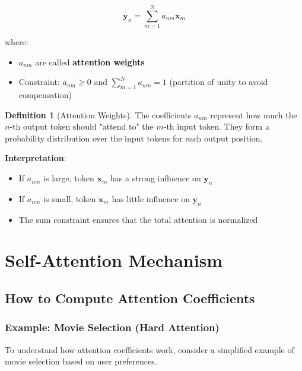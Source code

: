 \documentclass[11pt,a4paper]{article}
\theoremstyle{definition}
\newtheorem{definition}{Definition}[section]
\theoremstyle{plain}
\theoremstyle{remark}
\begin{document}
\[
\mathbf{y}_n = \sum_{m=1}^{N} a_{nm} \mathbf{x}_m
\]

where:
\begin{itemize}
    \item $a_{nm}$ are called \textbf{attention weights}
    \item Constraint: $a_{nm} \geq 0$ and $\sum_{m=1}^{N} a_{nm} = 1$ (partition of unity to avoid compensation)
\end{itemize}

\begin{definition}[Attention Weights]
The coefficients $a_{nm}$ represent how much the $n$-th output token should "attend to" the $m$-th input token. They form a probability distribution over the input tokens for each output position.
\end{definition}

\textbf{Interpretation}:
\begin{itemize}
    \item If $a_{nm}$ is large, token $\mathbf{x}_m$ has a strong influence on $\mathbf{y}_n$
    \item If $a_{nm}$ is small, token $\mathbf{x}_m$ has little influence on $\mathbf{y}_n$
    \item The sum constraint ensures that the total attention is normalized
\end{itemize}

\section{Self-Attention Mechanism}

\subsection{How to Compute Attention Coefficients}

\subsubsection{Example: Movie Selection (Hard Attention)}

To understand how attention coefficients work, consider a simplified example of movie selection based on user preferences.
\end{document}
